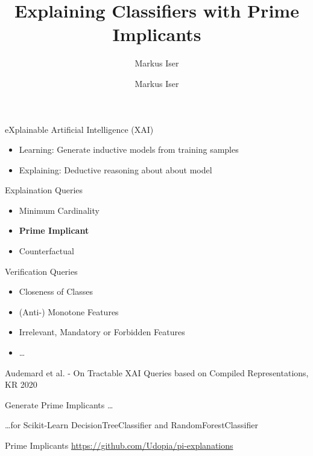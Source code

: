 \documentclass[t]{beamer}
\title{Explaining Classifiers with Prime Implicants}
\subtitle{Markus Iser}
\author{Markus Iser}
\institute{KIT-Institute of Theoretical Informatics -- Algorithm Engineering}
\begin{document}
\begin{frame}
\maketitle
\end{frame}


\begin{frame}{eXplainable Artificial Intelligence (XAI)}
\begin{itemize}
\item Learning: Generate inductive models from training samples\\
\item Explaining: Deductive reasoning about about model
\end{itemize}
\begin{block}{Explaination Queries}
\begin{itemize}
\item Minimum Cardinality
\item \textbf{Prime Implicant}
\item Counterfactual
\end{itemize}
\end{block}
\begin{block}{Verification Queries}
\begin{itemize}
\item Closeness of Classes
\item (Anti-) Monotone Features
\item Irrelevant, Mandatory or Forbidden Features
\item \dots
\end{itemize}
\end{block}
\footnotesize{Audemard et al. - On Tractable XAI Queries based on Compiled Representations, KR 2020}
\end{frame}


\begin{frame}{Generate Prime Implicants \dots }

\dots for Scikit-Learn \textsf{DecisionTreeClassifier} and \textsf{RandomForestClassifier}

\begin{block}{Prime Implicants}
\url{https://github.com/Udopia/pi-explanations}
\end{block}
\end{frame}
\end{document}
